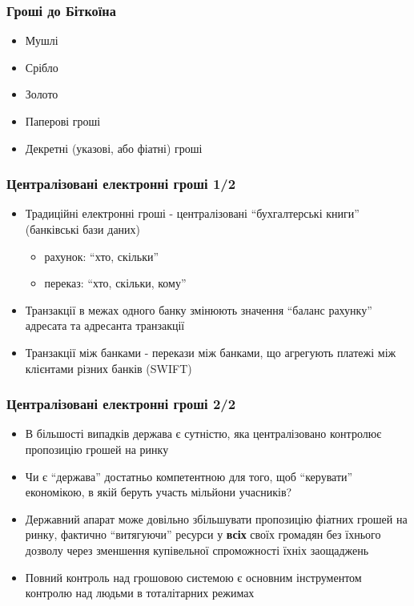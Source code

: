 \documentclass{beamer}
\begin{document}
\begin{frame}
  \frametitle{Гроші до Біткоїна}
  \begin{itemize}
  \item Мушлі
  \item Срібло
  \item Золото
  \item Паперові гроші
  \item Декретні (указові, або фіатні) гроші
  \end{itemize}
\end{frame}

\begin{frame}
  \frametitle{Централізовані електронні гроші 1/2}
  \begin{itemize}
  \item Традиційні електронні гроші - централізовані ``бухгалтерські книги''
    (банківські бази даних)
    \begin{itemize}
    \item рахунок: ``хто, скільки''
    \item переказ: ``хто, скільки, кому''
    \end{itemize}
  \item Транзакції в межах одного банку змінюють значення ``баланс рахунку''
    адресата та адресанта транзакції
  \item Транзакції між банками - перекази між банками, що агрегують платежі між
    клієнтами різних банків (SWIFT)
  \end{itemize}
  
\end{frame}

\begin{frame}
  \frametitle{Централізовані електронні гроші 2/2}
  \begin{itemize}
  \item В більшості випадків держава є сутністю, яка централізовано контролює
    пропозицію грошей на ринку
  \item Чи є ``держава'' достатньо компетентною для того, щоб ``керувати''
    економікою, в якій беруть участь мільйони учасників?
  \item Державний апарат може довільно збільшувати пропозицію фіатних грошей на
    ринку, фактично ``витягуючи'' ресурси у \textbf{всіх} своїх громадян без
    їхнього дозволу через зменшення купівельної спроможності їхніх заощаджень
  \item Повний контроль над грошовою системою є основним інструментом контролю
    над людьми в тоталітарних режимах
  \end{itemize}
\end{frame}
\end{document}
